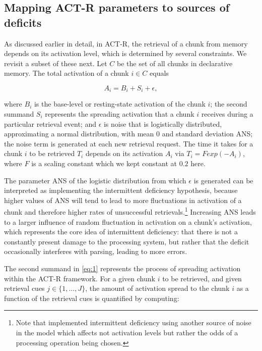 \documentclass{cambridge7A}\usepackage[]{graphicx}\usepackage[]{color}
\begin{document}
\subsection{Mapping ACT-R parameters to sources of deficits}

As discussed earlier in detail, in ACT-R, the retrieval of a chunk from memory depends on its activation level, which is determined by several constraints. We revisit a subset of these next. 
Let $C$ be the set of all chunks in declarative memory. The total activation of a chunk $i \in C$ equals

\begin{equation}\label{eq:1}
A_i = B_i + S_i + \epsilon,
\end{equation}

\noindent
where $B_i$ is the base-level or resting-state activation of the chunk $i$; the second summand $S_i$ represents the spreading activation that a chunk $i$ receives during a particular retrieval event; 
and $\epsilon$ is noise that is logistically distributed, approximating a normal distribution, with mean $0$ and standard deviation ANS; the noise term is generated at each new retrieval request.
The time it takes for a chunk $i$ to be retrieved $T_i$ depends on its activation $A_i$ via $T_i = F exp(-A_i)$, where $F$ is a scaling constant which we kept constant at $0.2$ here.

The parameter ANS of the logistic distribution from which $\epsilon$ is generated can be interpreted as implementing the intermittent deficiency hypothesis, because higher values of ANS will tend to lead to more fluctuations in activation of a chunk and therefore higher rates of unsuccessful retrievals.\footnote{Note that \cite{PatilEtAl2016} implemented intermittent deficiency using another source of noise in the model which affects not activation levels but rather the odds of a processing operation being chosen.} 
Increasing ANS leads to a larger influence of random fluctuation in activation on a chunk's activation, which represents the core idea of intermittent deficiency: that there is not a constantly present damage to the processing system, but rather that the deficit occasionally interferes with parsing, leading to more errors.

The second summand in \eqref{eq:1} represents the process of spreading activation within the ACT-R framework. For a given chunk $i$ to be retrieved, and given retrieval cues $j \in \{1, \ldots, J\}$, the amount of activation spread to the chunk $i$ as a function of the retrieval cues is quantified by computing: 
\end{document}

